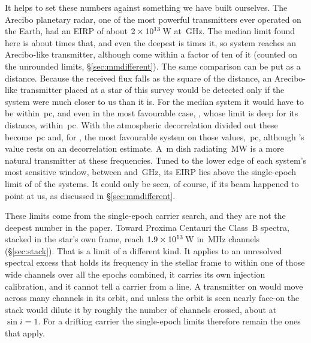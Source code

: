 It helps to set these numbers against something we have built ourselves.
The Arecibo planetary radar, one of the most powerful transmitters ever
operated on the Earth, had an EIRP of about $2\times10^{13}$\,W at
\AroFreqGHz\,GHz. The median limit found here is about \AroMedMult{} times
that, and even the deepest is \AroDeepMult{} times it, so
\AroNSysBelowWord{} system reaches an Arecibo-like transmitter, although
\AroNSysTen{} come within a factor of ten of it (counted on the unrounded
limits, \S\ref{sec:mmdifferent}). The same comparison can be
put as a distance. Because the received flux falls as the square of the
distance, an Arecibo-like transmitter placed at a star of this survey would
be detected only if the system were much closer to us than it is. For the
median system it would have to be within \AroDistMedPc\,pc, and even in the
most favourable case, \AroDistMaxStar, whose limit is deep for its distance,
within \AroDistMaxPc\,pc. With the atmospheric decorrelation divided out
these become \AroDistMedPcDec\,pc and, for \AroDistMaxStarDec, the most
favourable system on those values, \AroDistMaxPcDec\,pc, although \AroDistMaxStarDec's value rests on an
\AroDistMaxDecBasis{} decorrelation estimate. A \BenchDiam\,m dish radiating \BenchPowerMW\,MW is
a more natural transmitter at these frequencies. Tuned to the lower edge of
each system's most sensitive window, between \BenchTunedFreqLo{} and
\BenchTunedFreqHi\,GHz, its EIRP lies above the single-epoch limit of
\BenchNSysTuned{} of the \NSysALimSum{} systems. It could only be seen, of
course, if its beam happened to point at us, as discussed in
\S\ref{sec:mmdifferent}.

These limits come from the single-epoch carrier search, and they are not the
deepest number in the paper. Toward Proxima Centauri the Class~B spectra,
stacked in the star's own frame, reach $1.9\times10^{13}$\,W in
\ChanBModeMHz\,MHz channels (\S\ref{sec:stack}). That is a limit of a
different kind. It applies to an unresolved spectral excess that holds its
frequency in the stellar frame to within one of those wide channels over all
the epochs combined, it carries its own injection calibration, and it cannot
tell a carrier from a line. A transmitter on \PxPlanet{} would move across
many channels in its orbit, and unless the orbit is seen nearly face-on the
stack would dilute it by roughly the number of channels crossed, about
\PxNChanWalk{} at $\sin i=1$. For a drifting carrier the single-epoch
limits therefore remain the ones that apply.


